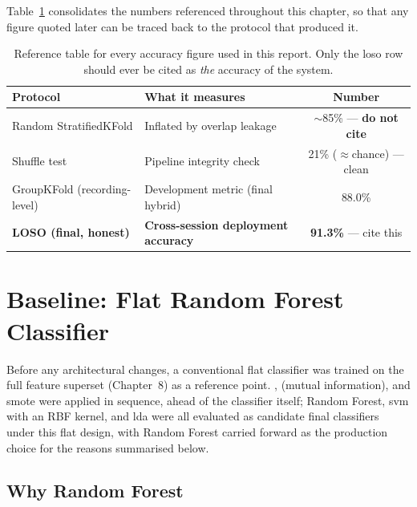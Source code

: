 Table~\ref{tab:honest_numbers} consolidates the numbers referenced
throughout this chapter, so that any figure quoted later can be
traced back to the protocol that produced it.

\begin{table}[htbp]
\centering
\caption{Reference table for every accuracy figure used in this
report. Only the \acrshort{loso} row should ever be cited as
\emph{the} accuracy of the system.}
\label{tab:honest_numbers}
\renewcommand{\arraystretch}{1.3}
\begin{tabular}{p{4.5cm} p{4.7cm} c}
\toprule
\textbf{Protocol} & \textbf{What it measures} & \textbf{Number} \\
\midrule
Random StratifiedKFold & Inflated by overlap leakage &
$\sim$85\% --- \textbf{do not cite} \\
Shuffle test & Pipeline integrity check & 21\% ($\approx$chance)
--- clean \\
GroupKFold (recording-level) & Development metric (final hybrid) &
88.0\% \\
\textbf{LOSO (final, honest)} & \textbf{Cross-session deployment
accuracy} & \textbf{91.3\%} --- cite this \\
\bottomrule
\end{tabular}
\end{table}

\section{Baseline: Flat Random Forest Classifier}
\label{sec:cl_baseline}

Before any architectural changes, a conventional flat classifier
was trained on the full feature superset (Chapter~8) as a
reference point. ,  (mutual
information), and \acrshort{smote} were applied in sequence, ahead
of the classifier itself; Random Forest, \acrshort{svm} with an RBF
kernel, and \acrshort{lda} were all evaluated as candidate final
classifiers under this flat design, with Random Forest carried
forward as the production choice for the reasons summarised below.

\subsection{Why Random Forest}

